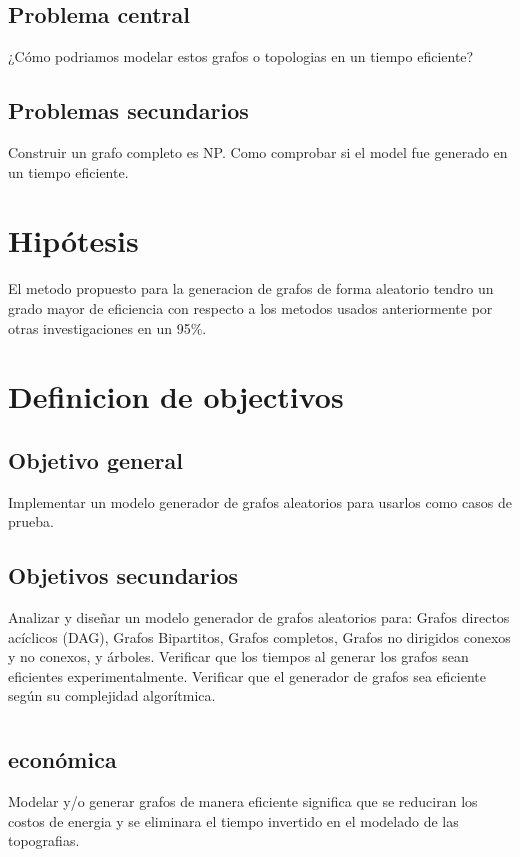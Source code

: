 \documentclass[11pt]{extarticle}
\begin{document}
  \subsection{Problema central}
    ¿C\'omo podriamos modelar estos grafos o topologias en un tiempo eficiente?
  \subsection{Problemas secundarios}
    \begin{itemize}
      \guion Construir un grafo completo es NP. 
      \guion Como comprobar si el model fue generado en un tiempo eficiente.
    \end{itemize}
\section{Hip\'otesis}
  El metodo propuesto para la generacion de grafos de forma aleatorio 
  tendro un grado mayor de eficiencia con respecto a los metodos
  usados anteriormente por otras investigaciones en un 95\%.

\section{Definicion de objectivos}
  \subsection{Objetivo general}
  Implementar un modelo generador de grafos aleatorios para usarlos como casos de prueba.
  \subsection{Objetivos secundarios}
      \begin{itemize}
        \guion Analizar y diseñar un modelo generador de grafos aleatorios para: Grafos directos acíclicos (DAG), Grafos Bipartitos, Grafos completos, Grafos no dirigidos conexos y no conexos, y árboles.
        \guion Verificar que los tiempos al generar los grafos sean eficientes experimentalmente.
        \guion Verificar que el generador de grafos sea eficiente según su complejidad algorítmica.
      \end{itemize}
\section{\justificacion}
  \subsection{\justificacion econ\'omica}
    Modelar y/o generar grafos de manera eficiente significa que se reduciran los costos de energia y se
    eliminara el tiempo invertido en el modelado de las topografias. 
\end{document}
